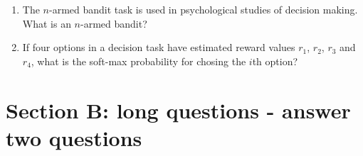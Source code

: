 \documentclass{article}
\newif\ifanswer
\begin{document}
\begin{enumerate}
\ifanswer
In both cases the line starts at 0.5 but in the consistient case it
rises quickly to one, in the inconsistient case it falls below 0.5
before rising more slowly to one. [1 mark for starting at 0.5 and rising to 1, the other for the dip in inconsistient].
\fi

\item The $n$-armed bandit task is used in psychological studies of decision making. What is an $n$-armed bandit?

  \ifanswer
  In an $n$-armed bandit the participant has to chose between $n$ options, typically $n$ buttons, each with a different probability of reward.
  \fi

\item If four options in a decision task have estimated reward values $r_1$, $r_2$, $r_3$ and $r_4$, what is the soft-max probability for chosing the $i$th option?

  \ifanswer
  \begin{equation}
    p_i=\frac{e^{\beta r_i}}{\sum_j e^{\beta r_j}}
  \end{equation}
  for some $\beta$, a parameter determining the exploration to explotation balance.
  \fi
  





  

  
\end{enumerate}
  
\section*{Section B: long questions - answer two questions}
\end{document}
